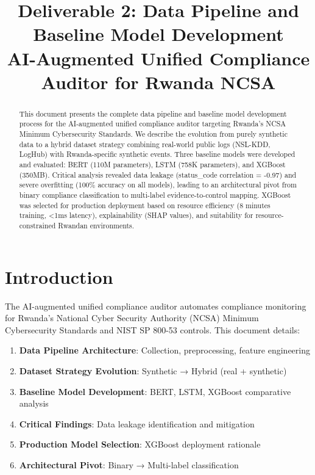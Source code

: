 \documentclass[11pt,conference]{IEEEtran}
\begin{document}
\title{Deliverable 2: Data Pipeline and Baseline Model Development\\AI-Augmented Unified Compliance Auditor for Rwanda NCSA}

\author{
}

\maketitle

\begin{abstract}
This document presents the complete data pipeline and baseline model development process for the AI-augmented unified compliance auditor targeting Rwanda's NCSA Minimum Cybersecurity Standards. We describe the evolution from purely synthetic data to a hybrid dataset strategy combining real-world public logs (NSL-KDD, LogHub) with Rwanda-specific synthetic events. Three baseline models were developed and evaluated: BERT (110M parameters), LSTM (758K parameters), and XGBoost (350MB). Critical analysis revealed data leakage (status\_code correlation = -0.97) and severe overfitting (100\% accuracy on all models), leading to an architectural pivot from binary compliance classification to multi-label evidence-to-control mapping. XGBoost was selected for production deployment based on resource efficiency (8 minutes training, <1ms latency), explainability (SHAP values), and suitability for resource-constrained Rwandan environments.
\end{abstract}

\section{Introduction}

The AI-augmented unified compliance auditor automates compliance monitoring for Rwanda's National Cyber Security Authority (NCSA) Minimum Cybersecurity Standards and NIST SP 800-53 controls. This document details:

\begin{enumerate}
    \item \textbf{Data Pipeline Architecture}: Collection, preprocessing, feature engineering
    \item \textbf{Dataset Strategy Evolution}: Synthetic → Hybrid (real + synthetic)
    \item \textbf{Baseline Model Development}: BERT, LSTM, XGBoost comparative analysis
    \item \textbf{Critical Findings}: Data leakage identification and mitigation
    \item \textbf{Production Model Selection}: XGBoost deployment rationale
    \item \textbf{Architectural Pivot}: Binary → Multi-label classification
\end{enumerate}
\end{document}
